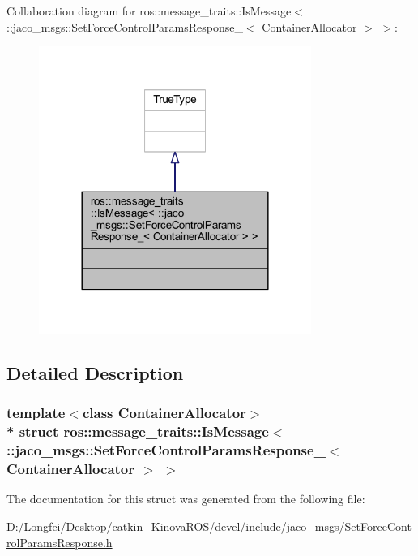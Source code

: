 Collaboration diagram for ros\+:\+:message\+\_\+traits\+:\+:Is\+Message$<$ \+:\+:jaco\+\_\+msgs\+:\+:Set\+Force\+Control\+Params\+Response\+\_\+$<$ Container\+Allocator $>$ $>$\+:
\nopagebreak
\begin{figure}[H]
\begin{center}
\leavevmode
\includegraphics[width=252pt]{d9/db8/structros_1_1message__traits_1_1IsMessage_3_01_1_1jaco__msgs_1_1SetForceControlParamsResponse___1b95ea0330b445587bd0422824d36d78}
\end{center}
\end{figure}


\subsection{Detailed Description}
\subsubsection*{template$<$class Container\+Allocator$>$\\*
struct ros\+::message\+\_\+traits\+::\+Is\+Message$<$ \+::jaco\+\_\+msgs\+::\+Set\+Force\+Control\+Params\+Response\+\_\+$<$ Container\+Allocator $>$ $>$}



The documentation for this struct was generated from the following file\+:\begin{DoxyCompactItemize}
\item 
D\+:/\+Longfei/\+Desktop/catkin\+\_\+\+Kinova\+R\+O\+S/devel/include/jaco\+\_\+msgs/\hyperlink{SetForceControlParamsResponse_8h}{Set\+Force\+Control\+Params\+Response.\+h}\end{DoxyCompactItemize}
